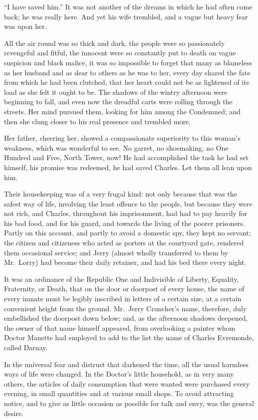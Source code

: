 ``I have saved him.''  It was not another of the dreams in which he had
often come back; he was really here.  And yet his wife trembled, and
a vague but heavy fear was upon her.

All the air round was so thick and dark, the people were so
passionately revengeful and fitful, the innocent were so constantly
put to death on vague suspicion and black malice, it was so
impossible to forget that many as blameless as her husband and as
dear to others as he was to her, every day shared the fate from which
he had been clutched, that her heart could not be as lightened of its
load as she felt it ought to be.  The shadows of the wintry afternoon
were beginning to fall, and even now the dreadful carts were rolling
through the streets.  Her mind pursued them, looking for him among
the Condemned; and then she clung closer to his real presence and
trembled more.

Her father, cheering her, showed a compassionate superiority to this
woman's weakness, which was wonderful to see.  No garret, no shoemaking,
no One Hundred and Five, North Tower, now!  He had accomplished the
task he had set himself, his promise was redeemed, he had saved Charles.
Let them all lean upon him.

Their housekeeping was of a very frugal kind:  not only because that
was the safest way of life, involving the least offence to the
people, but because they were not rich, and Charles, throughout his
imprisonment, had had to pay heavily for his bad food, and for his
guard, and towards the living of the poorer prisoners.  Partly on
this account, and partly to avoid a domestic spy, they kept no
servant; the citizen and citizeness who acted as porters at the
courtyard gate, rendered them occasional service; and Jerry (almost
wholly transferred to them by Mr.\ Lorry) had become their daily
retainer, and had his bed there every night.

It was an ordinance of the Republic One and Indivisible of Liberty,
Equality, Fraternity, or Death, that on the door or doorpost of every
house, the name of every inmate must be legibly inscribed in letters
of a certain size, at a certain convenient height from the ground.
Mr.\ Jerry Cruncher's name, therefore, duly embellished the doorpost
down below; and, as the afternoon shadows deepened, the owner of that
name himself appeared, from overlooking a painter whom Doctor Manette
had employed to add to the list the name of Charles Evremonde, called
Darnay.

In the universal fear and distrust that darkened the time, all the
usual harmless ways of life were changed.  In the Doctor's little
household, as in very many others, the articles of daily consumption
that were wanted were purchased every evening, in small quantities
and at various small shops.  To avoid attracting notice, and to give
as little occasion as possible for talk and envy, was the general desire.

